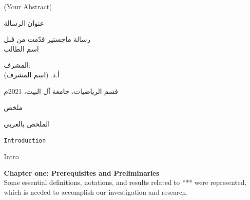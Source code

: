 \documentclass[12pt,a4paper,oneside]{book} %
\theoremstyle{definition}
\newcommand{\size}[2]{{\fontsize{#1}{0}\selectfont#2}} %
\begin{document}
(Your Abstract)

\clearpage

{} %

\begin{center}
\begin{Arabic}
\size{18}{عنوان الرسالة}
\end{Arabic}
\end{center}
\vspace{0.5in}
\begin{center}
\begin{Arabic}
\size{14}{رسالة ماجستير قدّمت من قبل
\\ اسم الطالب}
\end{Arabic}
\end{center}
\vspace{0.5in}
\begin{center}
\begin{Arabic}
\size{14}{المشرف:
\\أ.د. (اسم المشرف)}
\end{Arabic}
\end{center}
\vspace{0.5in}
\begin{center}
\begin{Arabic}
\size{14}{قسم الرياضيات، جامعة آل البيت، \foreignlanguage{english}{2021}م}
\end{Arabic}
\end{center}
\vspace{1in}
\begin{center}
\begin{Arabic}
\size{18}{ملخص}
\end{Arabic}
\end{center}
\vspace{0.5in}
\begin{center}
\begin{Arabic}
\size{14}{الملخص بالعربي
}\end{Arabic}
\end{center}


\clearpage

\mainmatter %
{}

\centerline{\texttt{Introduction}}


Intro

\textbf{Chapter one: Prerequisites and Preliminaries}
\\Some essential definitions, notations, and results related to *** were represented, which is needed to accomplish our investigation and research.
\end{document}
